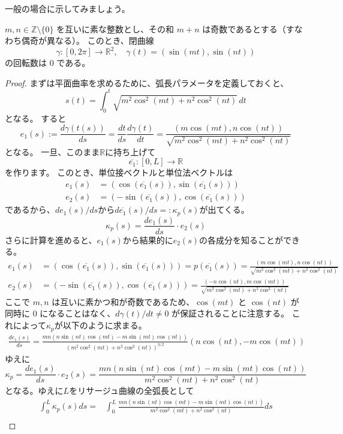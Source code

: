 一般の場合に示してみましょう。
\begin{theorem}
  $m, n \in \mathbb{Z} \setminus \{0\}$ を互いに素な整数とし、その和 $m+n$ は奇数であるとする（すなわち偶奇が異なる）。
  このとき、閉曲線
  \[
    \gamma: [0, 2\pi] \to \mathbb{R}^2, \quad \gamma(t) = (\sin(mt), \sin(nt))
  \]
  の回転数は $0$ である。
\end{theorem}
\begin{proof}
  まずは平面曲率を求めるために、弧長パラメータを定義しておくと、
  \[
    s(t)=\int_0^t \sqrt{m^2\cos^2(mt)+n^2\cos^2(nt)} \, dt
  \]
  となる。
  すると
  \[
    e_1(s):=\frac{d\gamma(t(s))}{ds}=\frac{dt}{ds}\frac{d\gamma(t)}{dt}=\frac{(m\cos(mt),n\cos(nt))}{\sqrt{m^2\cos^2(mt)+n^2\cos^2(nt)}}
  \]
  となる。
  一旦、このまま$\mathbb{R}$に持ち上げて
  \[
    \overline{e_1}:[0,L]\to\mathbb{R}
  \]
  を作ります。
  このとき、単位接ベクトルと単位法ベクトルは
  \begin{align*}
    e_1(s)&=(\cos(\overline{e_1}(s)),\sin(\overline{e_1}(s)))\\
    e_2(s)&=(-\sin(\overline{e_1}(s)),\cos(\overline{e_1}(s)))
  \end{align*}
  であるから、$de_1(s)/ds$から$d\overline{e_1}(s)/ds=:\kappa_p(s)$が出てくる。
  \[
    \kappa_p(s)=\frac{de_1(s)}{ds}\cdot e_2(s)
  \]
  さらに計算を進めると、$e_1(s)$から結果的に$e_2(s)$の各成分を知ることができる。
  \begin{align*}
    e_1(s)&=(\cos(\overline{e_1}(s)),\sin(\overline{e_1}(s)))=p(\overline{e_1}(s))=\frac{(m\cos(mt),n\cos(nt))}{\sqrt{m^2\cos^2(mt)+n^2\cos^2(nt)}}\\
    e_2(s)&=(-\sin(\overline{e_1}(s)),\cos(\overline{e_1}(s)))=\frac{(-n\cos(nt),m\cos(mt))}{\sqrt{m^2\cos^2(mt)+n^2\cos^2(nt)}}
  \end{align*}
  ここで $m, n$ は互いに素かつ和が奇数であるため、$\cos(mt)$ と $\cos(nt)$ が同時に $0$ になることはなく、$d\gamma(t)/dt \neq 0$ が保証されることに注意する。
  これによって$\kappa_p$が以下のように求まる。
  \begin{align*}
    \frac{de_1(s)}{ds}=\frac{mn(n\sin(nt)\cos(mt)-m\sin(mt)\cos(nt))}{(m^2\cos^2(mt)+n^2\cos^2(nt))^{3/2}}(n\cos(nt),-m\cos(mt))
  \end{align*}
  ゆえに
  \[
    \kappa_p=\frac{de_1(s)}{ds}\cdot e_2(s)=\frac{mn(n\sin(nt)\cos(mt)-m\sin(mt)\cos(nt))}{m^2\cos^2(mt)+n^2\cos^2(nt)}
  \]
  となる。ゆえに$L$をリサージュ曲線の全弧長として
  \begin{align*}
    \int_0^L\kappa_p(s)ds=&\int_0^{L}\frac{mn(n\sin(nt)\cos(mt)-m\sin(mt)\cos(nt))}{m^2\cos^2(mt)+n^2\cos^2(nt)}ds\\

\end{align*}
\end{proof}
